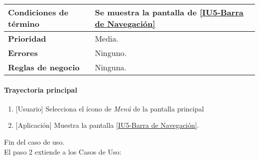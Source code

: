 \begin{longtable}{|J{5cm}|J{10.3cm}|}
	\textbf{Condiciones de término} & Se muestra la pantalla de \hyperref[fig:Barra de navegacion]{[IU5-Barra de Navegación]}
		\\ \hline 
	\textbf{Prioridad} & 
		Media. \\ \hline
	\textbf{Errores} & Ninguno.
		\\ \hline
	\textbf{Reglas de negocio} & Ninguna.
		 \\ \hline
\end{longtable}

\paragraph{Trayectoria principal}
	\begin{enumerate}
		\item {[Usuario]} Selecciona el ícono de \textit{Menú} de la pantalla principal %
		\item {[Aplicación]} Muestra la pantalla \hyperref[fig:Barra de navegacion]{[IU5-Barra de Navegación]}.
	\end{enumerate}
	Fin del caso de uso.\\
	El paso 2 extiende a los Casos de Uso: \hyperref[]{}
	
	

